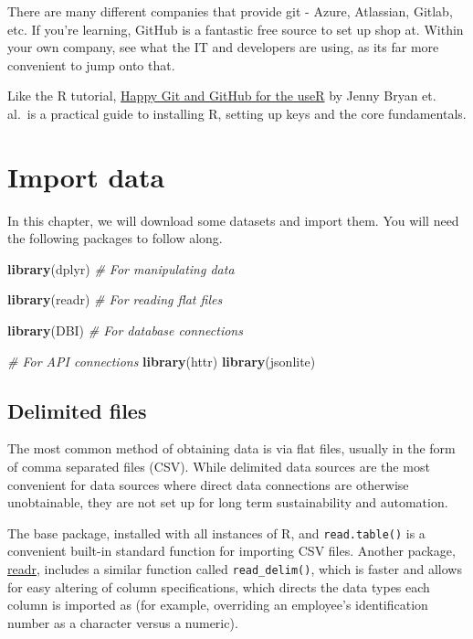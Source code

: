 \documentclass[
]{book}
\newenvironment{Shaded}{\begin{snugshade}}{\end{snugshade}}
\newcommand{\CommentTok}[1]{\textcolor[rgb]{0.56,0.35,0.01}{\textit{#1}}}
\newcommand{\KeywordTok}[1]{\textcolor[rgb]{0.13,0.29,0.53}{\textbf{#1}}}
\newcommand{\NormalTok}[1]{#1}
\begin{document}
There are many different companies that provide git - Azure, Atlassian, Gitlab, etc. If you're learning, GitHub is a fantastic free source to set up shop at. Within your own company, see what the IT and developers are using, as its far more convenient to jump onto that.

Like the R tutorial, \href{https://happygitwithr.com}{Happy Git and GitHub for the useR} by Jenny Bryan et. al.~is a practical guide to installing R, setting up keys and the core fundamentals.

\hypertarget{import-data}{%
\chapter{Import data}\label{import-data}}

In this chapter, we will download some datasets and import them. You will need the following packages to follow along.

\begin{Shaded}
\begin{Highlighting}[]
\KeywordTok{library}\NormalTok{(dplyr) }\CommentTok{# For manipulating data}

\KeywordTok{library}\NormalTok{(readr) }\CommentTok{# For reading flat files}

\KeywordTok{library}\NormalTok{(DBI) }\CommentTok{# For database connections}

\CommentTok{# For API connections}
\KeywordTok{library}\NormalTok{(httr)}
\KeywordTok{library}\NormalTok{(jsonlite)}
\end{Highlighting}
\end{Shaded}

\hypertarget{delimited-files}{%
\section{Delimited files}\label{delimited-files}}

The most common method of obtaining data is via flat files, usually in the form of comma separated files (CSV). While delimited data sources are the most convenient for data sources where direct data connections are otherwise unobtainable, they are not set up for long term sustainability and automation.

The base package, installed with all instances of R, and \texttt{read.table()} is a convenient built-in standard function for importing CSV files. Another package, \href{https://readr.tidyverse.org}{readr}, includes a similar function called \texttt{read\_delim()}, which is faster and allows for easy altering of column specifications, which directs the data types each column is imported as (for example, overriding an employee's identification number as a character versus a numeric).
\end{document}
